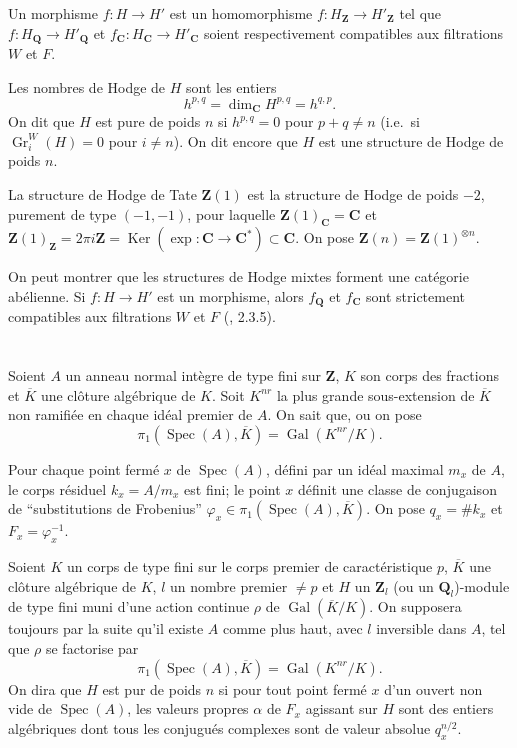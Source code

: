 \documentclass[12pt]{amsart}
\theoremstyle{definition}
\DeclareMathOperator{\Gr}{Gr}
\DeclareMathOperator{\Ker}{Ker}
\DeclareMathOperator{\Spec}{Spec}
\DeclareMathOperator{\Gal}{Gal}
\newcommand{\Q}{\mathbf{Q}}
\newcommand{\Z}{\mathbf{Z}}
\newcommand{\C}{\mathbf{C}}
\begin{document}
Un morphisme $f : H \to H'$ est un homomorphisme $f : H_{\Z} \to H'_{\Z}$ tel que $f : H_{\Q} \to H'_{\Q}$ et $f_{\C} : H_{\C} \to H'_{\C}$ soient respectivement compatibles aux filtrations $W$ et $F$.

Les nombres de Hodge de $H$ sont les entiers
\begin{equation}\label{eq1.2}
h^{p,q} = \dim_{\C} H^{p,q} = h^{q,p}.
\end{equation}
On dit que $H$ est pure de poids $n$ si $h^{p,q} = 0$ pour $p+q \neq n$ (i.e.\ si $\Gr_{i}^{W}(H) = 0$ pour $i \neq n$). On dit encore que $H$ est une structure de Hodge de poids $n$.

La structure de Hodge de Tate $\Z(1)$ est la structure de Hodge de poids $-2$, purement de type $(-1,-1)$, pour laquelle $\Z(1)_{\C} = \C$ et $\Z(1)_{\Z} = 2\pi i \Z = \Ker(\exp : \C \to \C^{*}) \subset \C$. On pose $\Z(n) = \Z(1)^{\otimes n}$.

On peut montrer que les structures de Hodge mixtes forment une catégorie abélienne. Si $f : H \to H'$ est un morphisme, alors $f_{\Q}$ et $f_{\C}$ sont strictement compatibles aux filtrations $W$ et $F$ (\cite{Hodge2}, 2.3.5).

\section{}

Soient $A$ un anneau normal intègre de type fini sur $\Z$, $K$ son corps des fractions et $\overline{K}$ une clôture algébrique de $K$. Soit $K^{nr}$ la plus grande sous-extension de $\overline{K}$ non ramifiée en chaque idéal premier de $A$. On sait que, ou on pose
\[
\pi_{1}(\Spec(A), \overline{K}) = \Gal(K^{nr}/K).
\]

Pour chaque point fermé $x$ de $\Spec(A)$, défini par un idéal maximal $m_{x}$ de $A$, le corps résiduel $k_{x} = A/m_{x}$ est fini; le point $x$ définit une classe de conjugaison de ``substitutions de Frobenius'' $\varphi_{x} \in \pi_{1}(\Spec(A), \overline{K})$. On pose $q_{x} = \# k_{x}$ et $F_{x} = \varphi_{x}^{-1}$.

Soient $K$ un corps de type fini sur le corps premier de caractéristique $p$, $\overline{K}$ une clôture algébrique de $K$, $l$ un nombre premier $\neq p$ et $H$ un $\Z_{l}$ (ou un $\Q_{l}$)-module de type fini muni d'une action continue $\rho$ de $\Gal(\overline{K}/K)$. On supposera toujours par la suite qu'il existe $A$ comme plus haut, avec $l$ inversible dans $A$, tel que $\rho$ se factorise par
\[
\pi_{1}(\Spec(A), \overline{K}) = \Gal(K^{nr}/K).
\]
On dira que $H$ est pur de poids $n$ si pour tout point fermé $x$ d'un ouvert non vide de $\Spec(A)$, les valeurs propres $\alpha$ de $F_{x}$ agissant sur $H$ sont des entiers algébriques dont tous les conjugués complexes sont de valeur absolue $q_{x}^{n/2}$.
\end{document}

